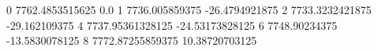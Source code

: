0 7762.4853515625 0.0
1 7736.005859375 -26.4794921875
2 7733.3232421875 -29.162109375
4 7737.95361328125 -24.53173828125
6 7748.90234375 -13.5830078125
8 7772.87255859375 10.38720703125
